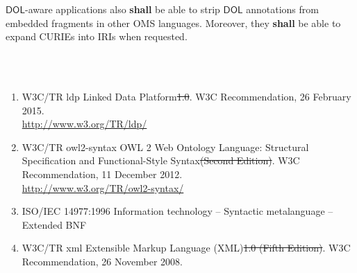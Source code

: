 \documentclass[10pt, a4paper]{isov2}
\newcommand{\bc}[1]{~\\{\color{violet}\large \hrulefill \href{http://issues.omg.org/browse/DOL-#1}{\normalfont{JIRA DOL-{}#1}} \hrulefill\\}  }
\newcommand*{\shall}{\textbf{shall}\xspace}
\newcommand*{\DOL}{\ensuremath{\mathsf{DOL}}\xspace}
\providecommand{\DIFaddtex}[1]{{\protect\color{blue}\uwave{#1}}} %
\providecommand{\DIFdeltex}[1]{{\protect\color{red}\sout{#1}}}                      %
\providecommand{\DIFaddbegin}{} %
\providecommand{\DIFaddend}{} %
\providecommand{\DIFdelbegin}{} %
\providecommand{\DIFdelend}{} %
\providecommand{\DIFadd}[1]{\texorpdfstring{\DIFaddtex{#1}}{#1}} %
\providecommand{\DIFdel}[1]{\texorpdfstring{\DIFdeltex{#1}}{}} %
\begin{document}
\DOL-aware applications also  \shall  be able to strip \DOL annotations
from embedded fragments in other OMS languages. Moreover, they  \shall 
be able to expand CURIEs into IRIs when requested.



\cleardoublepage
{}
\bc{96}   
 \begin{enumerate} [label=\bfseries NR\arabic*]
  \DIFdelbegin %
\DIFdelend \DIFaddbegin \item{W3C/TR ldp} \DIFaddend {Linked Data Platform\DIFdelbegin \DIFdel{1.0}\DIFdelend . W3C Recommendation, 26 February 2015.\\ \DIFdelbegin %
\DIFdelend \DIFaddbegin \url{http://www.w3.org/TR/ldp/}\DIFaddend }\label{nref-linked-data}
  \DIFdelbegin %
\DIFdelend \DIFaddbegin \item{W3C/TR owl2-syntax} \DIFaddend {OWL 2 Web Ontology Language: Structural Specification and Functional-Style Syntax\DIFdelbegin \DIFdel{(Second Edition)}\DIFdelend . W3C Recommendation, 11 December 2012.\\ \DIFdelbegin %
\DIFdelend \DIFaddbegin \url{http://www.w3.org/TR/owl2-syntax/}\DIFaddend }\label{nref-OWL2}
  \item{ISO/IEC 14977:1996} {Information technology – Syntactic metalanguage – Extended BNF\DIFaddbegin \DIFadd{.}\DIFaddend }\label{nref-EBNF}
  \DIFdelbegin %
\DIFdelend \DIFaddbegin \item{W3C/TR xml} \DIFaddend {Extensible Markup Language (XML)\DIFdelbegin \DIFdel{1.0 (Fifth Edition)}\DIFdelend . W3C Recommendation, 26 November 2008. \\
}
\end{enumerate}
\end{document}
